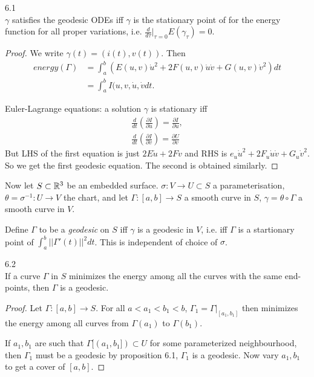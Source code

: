\documentclass[a4paper]{article}
\begin{document}
\begin{prop} 6.1\\
$\gamma$ satisfies the geodesic ODEs iff $\gamma$ is the stationary point of for the energy function for all proper variations, i.e. $\frac{d}{d\tau}|_{\tau=0} E(\gamma_\tau) = 0$.
\begin{proof}
We write $\gamma(t) = (i(t),v(t))$. Then
\begin{equation*}
\begin{aligned}
energy(\Gamma) &= \int_a^b \left(E(u,v) \dot{u}^2 + 2F(u,v) \dot{u}\dot{v} + G(u,v) \dot{v}^2\right) dt\\
&= \int_a^b I(u,v,\dot{u},\dot{v} dt.
\end{aligned}
\end{equation*}

Euler-Lagrange equations: a solution $\gamma$ is stationary iff
\begin{equation*}
\begin{aligned}
\frac{d}{dt} \left(\frac{\partial I}{\partial \dot{u}}\right) = \frac{\partial I}{\partial u},\\
\frac{d}{dt} \left(\frac{\partial I}{\partial \dot{v}}\right) = \frac{\partial U}{\partial v}
\end{aligned}
\end{equation*}
But LHS of the first equation is just $2E\dot{u}+2F \dot{v}$ and RHS is $e_u \dot{u}^2 + 2F_u \dot{u} \dot{v} + G_u \dot{v}^2$. So we get the first geodesic equation. The second is obtained similarly.
\end{proof}
\end{prop}

Now let $S \subset \mathbb{R}^3$ be an embedded surface. $\sigma: V \to U \subset S$ a parameterisation, $\theta = \sigma^{-1}:U \to V$ the chart, and let $\Gamma:[a,b] \to S$ a smooth curve in $S$, $\gamma = \theta\circ \Gamma$ a smooth curve in $V$.

Define $\Gamma$ to be a \emph{geodesic} on $S$ iff $\gamma$ is a geodesic in $V$, i.e. iff $\Gamma$ is a startionary point of $\int_a^b ||\Gamma'(t)||^2 dt$. This is independent of choice of $\sigma$.

\begin{coro} 6.2\\
If a curve $\Gamma$ in $S$ minimizes the energy among all the curves with the same end-points, then $\Gamma$ is a geodesic.
\begin{proof}
Let $\Gamma:[a,b] \to S$. For all $a<a_1<b_1<b$, $\Gamma_1 = \Gamma|_{[a_1,b_1]}$ then minimizes the energy among all curves from $\Gamma(a_1)$ to $\Gamma(b_1)$.

If $a_1,b_1$ are such that $\Gamma[(a_1,b_1]) \subset U$ for some parameterized neighbourhood, then $\Gamma_1$ must be a geodesic by proposition 6.1, $\Gamma_1$ is a geodesic. Now vary $a_1,b_1$ to get a cover of $[a,b]$.
\end{proof}
\end{coro}
\end{document}
